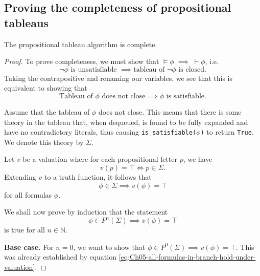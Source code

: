 \subsection{Proving the completeness of propositional tableaus}

\begin{theorem}
    The propositional tableau algorithm is complete.
\end{theorem}
\begin{proof}
    To prove completeness, we must show that \(\models\phi\;\implies\;\vdash\phi\), i.e.
    \[\neg\phi \text{ is unsatisfiable } \implies \text{tableau of } \neg\phi \text{ is closed.}\]
    Taking the contrapositive and renaming our variables, we see that this is equivalent to showing that
    \[\text{Tableau of } \phi \text{ does not close} \implies \phi \text{ is satisfiable.}\]

    Assume that the tableau of \(\phi\) does not close. This means that there is some theory in the tableau that, when dequeued, is found to be fully expanded and have no contradictory literals, thus causing \verb|is_satisfiable(|\(\phi\)\verb|)| to return \texttt{True}. We denote this theory by \(\Sigma\).

    Let \(v\) be a valuation where for each propositional letter \(p\), we have
    \[v(p) = \top \iff p \in \Sigma\text{.}\]
    Extending \(v\) to a truth function, it follows that
    \begin{equation}\label{eq:Ch05-all-formulas-in-branch-hold-under-valuation}
        \phi\in\Sigma\implies v(\phi) = \top\tag{*}
    \end{equation}
    for all formulas \(\phi\).

    We shall now prove by induction that the statement
    \[\phi \in P^n (\Sigma) \implies v(\phi) = \top\]
    is true for all \(n \in \mathbb{N}\).

    \textbf{Base case.} For \(n = 0\), we want to show that \(\phi \in P^0 (\Sigma) \implies v(\phi) = \top\). This was already established by equation \eqref{eq:Ch05-all-formulas-in-branch-hold-under-valuation}.


\end{proof}
